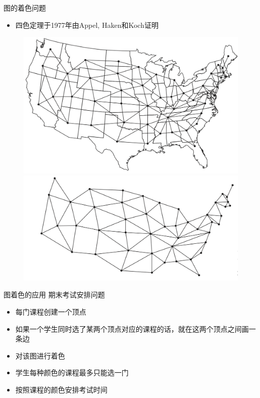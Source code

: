 \documentclass[UTF8]{ctexbeamer}
\begin{document}
\begin{frame}{图的着色问题}
  \begin{itemize}
  \item 四色定理于1977年由Appel, Haken和Koch证明
  \end{itemize}
  \begin{figure}
    \centering
    \includegraphics[height=.35\textheight{}]{map_graph2.png}
    \includegraphics[height=.35\textheight{}]{map_graph.png}
  \end{figure}

\end{frame}

\begin{frame}{图着色的应用}
  期末考试安排问题
  \begin{itemize}
  \item 每门课程创建一个顶点
  \item 如果一个学生同时选了某两个顶点对应的课程的话，就在这两个顶点之间画一条边
  \item 对该图进行着色
  \item 学生每种颜色的课程最多只能选一门
  \item 按照课程的颜色安排考试时间
  \end{itemize}
\end{frame}
\end{document}
